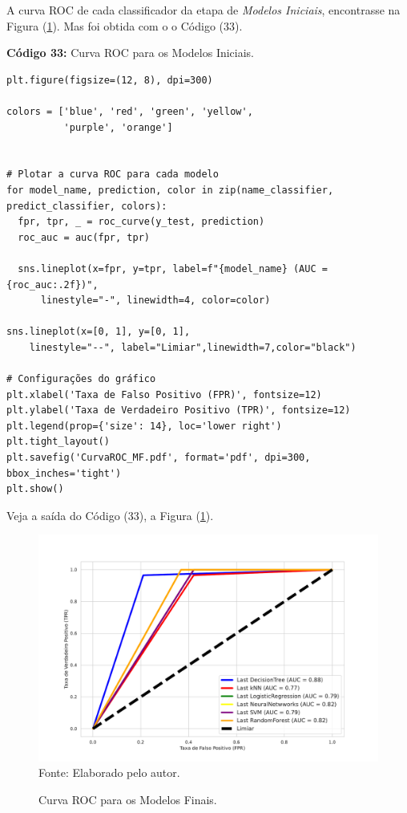 \documentclass[a4paper,12pt]{article} %
\begin{document}
A curva ROC de cada classificador da etapa de \textit{Modelos Iniciais}, encontrasse na Figura (\ref{fig:8}). Mas foi obtida com o o Código (33).
\begin{center}
\textbf{Código 33:} Curva ROC para os Modelos Iniciais.
\begin{verbatim}
plt.figure(figsize=(12, 8), dpi=300)

colors = ['blue', 'red', 'green', 'yellow',
          'purple', 'orange']


# Plotar a curva ROC para cada modelo
for model_name, prediction, color in zip(name_classifier, predict_classifier, colors):
  fpr, tpr, _ = roc_curve(y_test, prediction)
  roc_auc = auc(fpr, tpr)

  sns.lineplot(x=fpr, y=tpr, label=f"{model_name} (AUC = {roc_auc:.2f})",
      linestyle="-", linewidth=4, color=color)

sns.lineplot(x=[0, 1], y=[0, 1],
    linestyle="--", label="Limiar",linewidth=7,color="black")

# Configurações do gráfico
plt.xlabel('Taxa de Falso Positivo (FPR)', fontsize=12)
plt.ylabel('Taxa de Verdadeiro Positivo (TPR)', fontsize=12)
plt.legend(prop={'size': 14}, loc='lower right')
plt.tight_layout()
plt.savefig('CurvaROC_MF.pdf', format='pdf', dpi=300, bbox_inches='tight')
plt.show()
\end{verbatim}
\end{center}

Veja a saída do Código (33), a Figura (\ref{fig:8}).
 \begin{figure}[H]
     \centering
     \caption{Curva ROC para os Modelos Finais.}
     \includegraphics[scale=0.55]{Figures/CurvaROC_MF.pdf}
     \label{fig:8}
     Fonte: Elaborado pelo autor.
 \end{figure}
 
\end{document}
